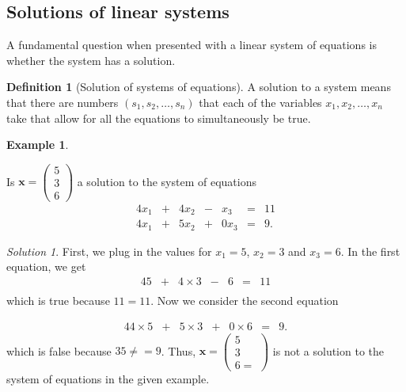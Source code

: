 \documentclass[
]{book}
\theoremstyle{definition}
\newtheorem{definition}{Definition}[chapter]
\theoremstyle{definition}
\newtheorem{example}{Example}[chapter]
\theoremstyle{definition}
\theoremstyle{remark}
\newtheorem*{solution}{Solution}
\begin{document}
\hypertarget{solutions-of-linear-systems}{%
\subsection{Solutions of linear systems}\label{solutions-of-linear-systems}}

A fundamental question when presented with a linear system of equations is whether the system has a solution.

\begin{definition}[Solution of systems of equations]
\protect\hypertarget{def:unnamed-chunk-29}{}{\label{def:unnamed-chunk-29} {} }A solution to a system means that there are numbers \((s_1, s_2, \ldots, s_n)\) that each of the variables \(x_1, x_2, \ldots, x_n\) take that allow for all the equations to simultaneously be true.
\end{definition}

\begin{example}
\protect\hypertarget{exm:unlabeled-div-48}{}\label{exm:unlabeled-div-48}

Is \(\mathbf{x} = \begin{pmatrix} 5 \\ 3 \\ 6 \end{pmatrix}\) a solution to the system of equations
\begin{alignat*}{4}
x_1   & {}+{} & 4 x_2 & {}-{} & x_3 & {}={} & 11 \\
4 x_1 & {}+{} & 5 x_2 & {}+{} & 0 x_3 & {}={} & 9.
\end{alignat*}

\end{example}

\begin{solution}

First, we plug in the values for \(x_1 = 5\), \(x_2 = 3\) and \(x_3 = 6\). In the first equation, we get
\begin{alignat*}{4}
5   & {}+{} & 4 \times 3 & {}-{} & 6 & {}={} & 11 \\
\end{alignat*}
which is true because \(11 = 11\). Now we consider the second equation

\begin{alignat*}{4}
4 \times 5 & {}+{} & 5 \times 3 & {}+{} & 0 \times 6 & {}={} & 9.
\end{alignat*}
which is false because \(35 \neq = 9\). Thus, \(\mathbf{x} = \begin{pmatrix} 5 \\ 3 \\ 6 = \end{pmatrix}\) is not a solution to the system of equations in the given example.

\end{solution}
\end{document}
